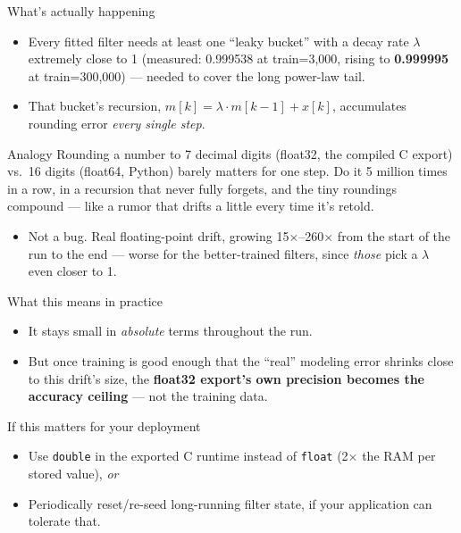 \documentclass[11pt]{beamer}
\begin{document}
\begin{frame}{What's actually happening}
\begin{itemize}
\item Every fitted filter needs at least one ``leaky bucket'' with a decay rate $\lambda$ extremely close to 1 (measured: 0.999538 at train=3,000, rising to \textbf{0.999995} at train=300,000) --- needed to cover the long power-law tail.
\item That bucket's recursion, $m[k] = \lambda \cdot m[k-1] + x[k]$, accumulates rounding error \emph{every single step}.
\end{itemize}
\begin{exampleblock}{Analogy}
Rounding a number to 7 decimal digits (float32, the compiled C export) vs.\ 16 digits (float64, Python) barely matters for one step. Do it 5 million times in a row, in a recursion that never fully forgets, and the tiny roundings compound --- like a rumor that drifts a little every time it's retold.
\end{exampleblock}
\begin{itemize}
\item Not a bug. Real floating-point drift, growing 15$\times$--260$\times$ from the start of the run to the end --- worse for the better-trained filters, since \emph{those} pick a $\lambda$ even closer to 1.
\end{itemize}
\end{frame}

\begin{frame}{What this means in practice}
\begin{itemize}
\item It stays small in \emph{absolute} terms throughout the run.
\item But once training is good enough that the ``real'' modeling error shrinks close to this drift's size, the \textbf{float32 export's own precision becomes the accuracy ceiling} --- not the training data.
\end{itemize}
\begin{block}{If this matters for your deployment}
\begin{itemize}
\item Use \texttt{double} in the exported C runtime instead of \texttt{float} (2$\times$ the RAM per stored value), \emph{or}
\item Periodically reset/re-seed long-running filter state, if your application can tolerate that.
\end{itemize}
\end{block}
\end{frame}
\end{document}

